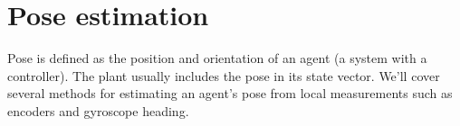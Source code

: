 
\chapter{Pose estimation}

Pose is defined as the position and orientation of an \gls{agent} (a system
with a controller). The plant usually includes the pose in its state vector.
We'll cover several methods for estimating an agent's pose from local
measurements such as encoders and gyroscope heading.

\renewcommand*{\chapterpath}{\partpath/pose-estimation}



